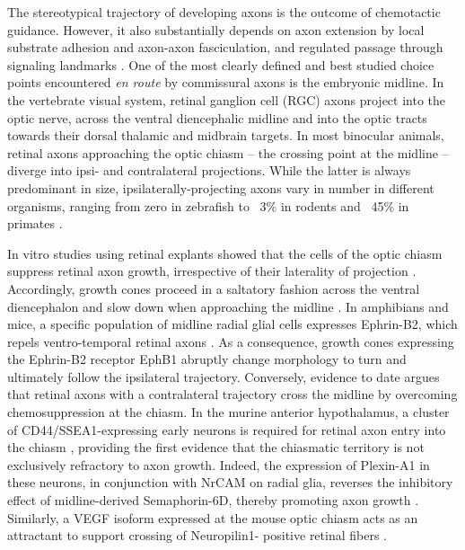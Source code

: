 The stereotypical trajectory of developing axons is the outcome of chemotactic guidance.
However, it also substantially depends on axon extension by local substrate adhesion and axon-axon fasciculation, and regulated passage through signaling landmarks \cite{raper2010cellular}.
One of the most clearly defined and best studied choice points encountered \emph{en route} by commissural axons is the embryonic midline.
In the vertebrate visual system, retinal ganglion cell (RGC) axons project into the optic nerve, across the ventral diencephalic midline and into the optic tracts towards their dorsal thalamic and midbrain targets.
In most binocular animals, retinal axons approaching the optic chiasm -- the crossing point at the midline -- diverge into ipsi- and contralateral projections.
While the latter is always predominant in size, ipsilaterally-projecting axons vary in number in different organisms, ranging from zero in zebrafish to ~3\% in rodents and ~45\% in primates \cite{jeffery2005variations}.

In vitro studies using retinal explants showed that the cells of the optic chiasm suppress retinal axon growth, irrespective of their laterality of projection \cite{wizenmann1993differential,wang1995crossed,wang1996chemosuppression,kuwajima2012optic}.
Accordingly, growth cones proceed in a saltatory fashion across the ventral diencephalon and slow down when approaching the midline \cite{harris1987retinal,mason1997growth,hutson2002pathfinding}.
In amphibians and mice, a specific population of midline radial glial cells expresses Ephrin-B2, which repels ventro-temporal retinal
axons \cite{nakagawa2000ephrin,williams2003ephrin}.
As a consequence, growth cones expressing the Ephrin-B2 receptor EphB1 abruptly change morphology to turn and ultimately follow the ipsilateral trajectory.
Conversely, evidence to date argues that retinal axons with a contralateral trajectory cross the midline by overcoming chemosuppression at the chiasm.
In the murine anterior hypothalamus, a cluster of CD44/SSEA1-expressing early neurons is required for retinal axon entry into the chiasm \cite{sretavan1995disruption}, providing the first evidence that the chiasmatic territory is not exclusively refractory to axon growth.
Indeed, the expression of Plexin-A1 in these neurons, in conjunction with NrCAM on radial glia, reverses the inhibitory effect of midline-derived Semaphorin-6D, thereby promoting axon growth \cite{williams2006role,kuwajima2012optic}.
Similarly, a VEGF isoform expressed at the mouse optic chiasm acts as an attractant to support crossing of Neuropilin1- positive retinal fibers \cite{erskine2011vegf}.

